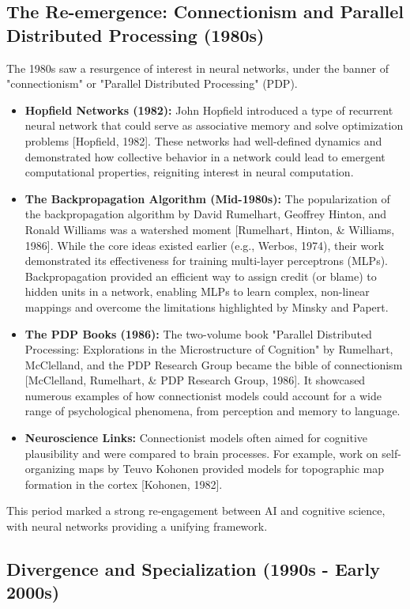 \documentclass[11pt,a4paper]{article}
\begin{document}
\subsection{The Re-emergence: Connectionism and Parallel Distributed Processing (1980s)}

The 1980s saw a resurgence of interest in neural networks, under the banner of "connectionism" or "Parallel Distributed Processing" (PDP).
\begin{itemize}
    \item \textbf{Hopfield Networks (1982):} John Hopfield introduced a type of recurrent neural network that could serve as associative memory and solve optimization problems [Hopfield, 1982]. These networks had well-defined dynamics and demonstrated how collective behavior in a network could lead to emergent computational properties, reigniting interest in neural computation.
    \item \textbf{The Backpropagation Algorithm (Mid-1980s):} The popularization of the backpropagation algorithm by David Rumelhart, Geoffrey Hinton, and Ronald Williams was a watershed moment [Rumelhart, Hinton, \& Williams, 1986]. While the core ideas existed earlier (e.g., Werbos, 1974), their work demonstrated its effectiveness for training multi-layer perceptrons (MLPs). Backpropagation provided an efficient way to assign credit (or blame) to hidden units in a network, enabling MLPs to learn complex, non-linear mappings and overcome the limitations highlighted by Minsky and Papert.
    \item \textbf{The PDP Books (1986):} The two-volume book "Parallel Distributed Processing: Explorations in the Microstructure of Cognition" by Rumelhart, McClelland, and the PDP Research Group became the bible of connectionism [McClelland, Rumelhart, \& PDP Research Group, 1986]. It showcased numerous examples of how connectionist models could account for a wide range of psychological phenomena, from perception and memory to language.
    \item \textbf{Neuroscience Links:} Connectionist models often aimed for cognitive plausibility and were compared to brain processes. For example, work on self-organizing maps by Teuvo Kohonen provided models for topographic map formation in the cortex [Kohonen, 1982].
\end{itemize}
This period marked a strong re-engagement between AI and cognitive science, with neural networks providing a unifying framework.

\subsection{Divergence and Specialization (1990s - Early 2000s)}
\end{document}
